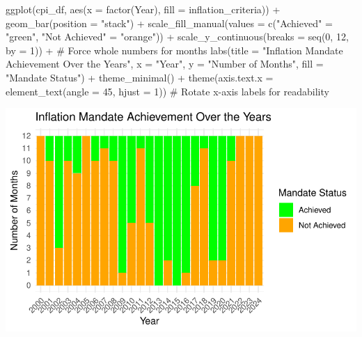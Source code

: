 \documentclass[
  letterpaper,
  DIV=11,
  numbers=noendperiod]{scrartcl}
\newenvironment{Shaded}{\begin{snugshade}}{\end{snugshade}}
\newcommand{\AttributeTok}[1]{\textcolor[rgb]{0.40,0.45,0.13}{#1}}
\newcommand{\CommentTok}[1]{\textcolor[rgb]{0.37,0.37,0.37}{#1}}
\newcommand{\DecValTok}[1]{\textcolor[rgb]{0.68,0.00,0.00}{#1}}
\newcommand{\FunctionTok}[1]{\textcolor[rgb]{0.28,0.35,0.67}{#1}}
\newcommand{\NormalTok}[1]{\textcolor[rgb]{0.00,0.23,0.31}{#1}}
\newcommand{\OtherTok}[1]{\textcolor[rgb]{0.00,0.23,0.31}{#1}}
\newcommand{\SpecialCharTok}[1]{\textcolor[rgb]{0.37,0.37,0.37}{#1}}
\newcommand{\StringTok}[1]{\textcolor[rgb]{0.13,0.47,0.30}{#1}}
\begin{document}
\begin{Shaded}
\begin{Highlighting}[]
\FunctionTok{ggplot}\NormalTok{(cpi\_df, }\FunctionTok{aes}\NormalTok{(}\AttributeTok{x =} \FunctionTok{factor}\NormalTok{(Year), }\AttributeTok{fill =}\NormalTok{ inflation\_criteria)) }\SpecialCharTok{+}
  \FunctionTok{geom\_bar}\NormalTok{(}\AttributeTok{position =} \StringTok{"stack"}\NormalTok{) }\SpecialCharTok{+}  
  \FunctionTok{scale\_fill\_manual}\NormalTok{(}\AttributeTok{values =} \FunctionTok{c}\NormalTok{(}\StringTok{"Achieved"} \OtherTok{=} \StringTok{"green"}\NormalTok{, }\StringTok{"Not Achieved"} \OtherTok{=} \StringTok{"orange"}\NormalTok{)) }\SpecialCharTok{+}
  \FunctionTok{scale\_y\_continuous}\NormalTok{(}\AttributeTok{breaks =} \FunctionTok{seq}\NormalTok{(}\DecValTok{0}\NormalTok{, }\DecValTok{12}\NormalTok{, }\AttributeTok{by =} \DecValTok{1}\NormalTok{)) }\SpecialCharTok{+}  \CommentTok{\# Force whole numbers for months}
  \FunctionTok{labs}\NormalTok{(}\AttributeTok{title =} \StringTok{"Inflation Mandate Achievement Over the Years"}\NormalTok{,}
       \AttributeTok{x =} \StringTok{"Year"}\NormalTok{,}
       \AttributeTok{y =} \StringTok{"Number of Months"}\NormalTok{,}
       \AttributeTok{fill =} \StringTok{"Mandate Status"}\NormalTok{) }\SpecialCharTok{+}
  \FunctionTok{theme\_minimal}\NormalTok{() }\SpecialCharTok{+}
  \FunctionTok{theme}\NormalTok{(}\AttributeTok{axis.text.x =} \FunctionTok{element\_text}\NormalTok{(}\AttributeTok{angle =} \DecValTok{45}\NormalTok{, }\AttributeTok{hjust =} \DecValTok{1}\NormalTok{))  }\CommentTok{\# Rotate x{-}axis labels for readability}
\end{Highlighting}
\end{Shaded}

\includegraphics{Assignment2_Data608_Quarto_files/figure-pdf/unnamed-chunk-29-1.pdf}
\end{document}
